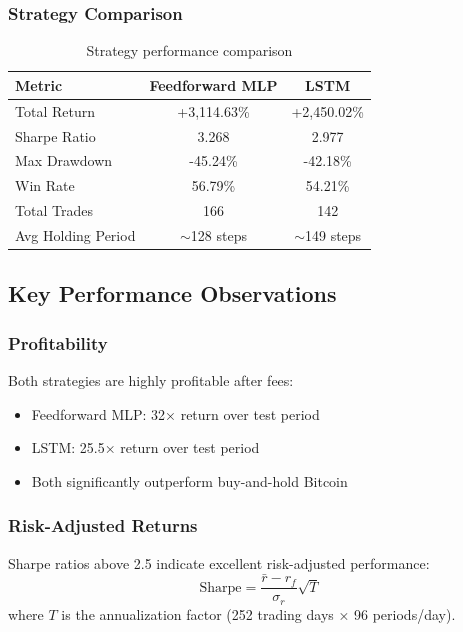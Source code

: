 \documentclass[12pt,a4paper]{article}
\begin{document}
\subsubsection{Strategy Comparison}
\begin{table}[H]
\centering
\begin{tabular}{lcc}
\toprule
\textbf{Metric} & \textbf{Feedforward MLP} & \textbf{LSTM} \\
\midrule
Total Return & +3,114.63\% & +2,450.02\% \\
Sharpe Ratio & 3.268 & 2.977 \\
Max Drawdown & -45.24\% & -42.18\% \\
Win Rate & 56.79\% & 54.21\% \\
Total Trades & 166 & 142 \\
Avg Holding Period & $\sim$128 steps & $\sim$149 steps \\
\bottomrule
\end{tabular}
\caption{Strategy performance comparison}
\end{table}

\subsection{Key Performance Observations}

\subsubsection{Profitability}
Both strategies are highly profitable after fees:
\begin{itemize}
    \item Feedforward MLP: 32× return over test period
    \item LSTM: 25.5× return over test period
    \item Both significantly outperform buy-and-hold Bitcoin
\end{itemize}

\subsubsection{Risk-Adjusted Returns}
Sharpe ratios above 2.5 indicate excellent risk-adjusted performance:
\begin{equation}
    \text{Sharpe} = \frac{\bar{r} - r_f}{\sigma_r} \sqrt{T}
\end{equation}
where $T$ is the annualization factor (252 trading days × 96 periods/day).
\end{document}
